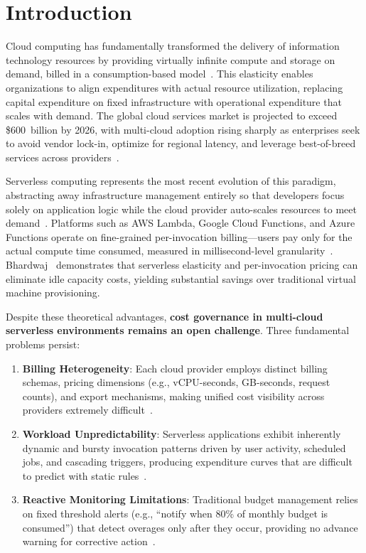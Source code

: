 \documentclass[conference]{IEEEtran}
\begin{document}
\section{Introduction}
\label{sec:introduction}

Cloud computing has fundamentally transformed the delivery of information technology resources by providing virtually infinite compute and storage on demand, billed in a consumption-based model~\cite{armbrust2010view}. This elasticity enables organizations to align expenditures with actual resource utilization, replacing capital expenditure on fixed infrastructure with operational expenditure that scales with demand. The global cloud services market is projected to exceed \$600~billion by 2026, with multi-cloud adoption rising sharply as enterprises seek to avoid vendor lock-in, optimize for regional latency, and leverage best-of-breed services across providers~\cite{gartner2024}.

Serverless computing represents the most recent evolution of this paradigm, abstracting away infrastructure management entirely so that developers focus solely on application logic while the cloud provider auto-scales resources to meet demand~\cite{weyori2024}. Platforms such as AWS Lambda, Google Cloud Functions, and Azure Functions operate on fine-grained per-invocation billing---users pay only for the actual compute time consumed, measured in millisecond-level granularity~\cite{jonas2019}. Bhardwaj~\cite{bhardwaj2023} demonstrates that serverless elasticity and per-invocation pricing can eliminate idle capacity costs, yielding substantial savings over traditional virtual machine provisioning.

Despite these theoretical advantages, \textbf{cost governance in multi-cloud serverless environments remains an open challenge}. Three fundamental problems persist:

\begin{enumerate}
    \item \textbf{Billing Heterogeneity}: Each cloud provider employs distinct billing schemas, pricing dimensions (e.g., vCPU-seconds, GB-seconds, request counts), and export mechanisms, making unified cost visibility across providers extremely difficult~\cite{raghunathan2022}.
    
    \item \textbf{Workload Unpredictability}: Serverless applications exhibit inherently dynamic and bursty invocation patterns driven by user activity, scheduled jobs, and cascading triggers, producing expenditure curves that are difficult to predict with static rules~\cite{eismann2021}.
    
    \item \textbf{Reactive Monitoring Limitations}: Traditional budget management relies on fixed threshold alerts (e.g., ``notify when 80\% of monthly budget is consumed'') that detect overages only after they occur, providing no advance warning for corrective action~\cite{richards2025}.
\end{enumerate}
\end{document}
